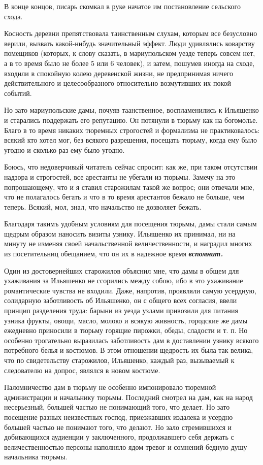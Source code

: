 \documentclass[a4paper,20pt]{article}
\begin{document}
В конце концов, писарь скомкал в руке начатое им постановление сельского схода.

Косность деревни препятствовала таинственным слухам, которым все безусловно
верили, вызвать какой-нибудь значительный эффект. Люди удивлялись коварству
помещиков (которых, к слову сказать, в мариупольском уезде теперь совсем нет, а
в то время было не более 5 или 6 человек), и затем, пошумев иногда на сходе,
входили в спокойную колею деревенской жизни, не предпринимая ничего
действительного и целесообразного относительно возмутивших их покой событий.

Но зато мариупольские дамы, почуяв таанственное, воспламенились к Ильяшенко и
старались поддержать его репутацию. Он потянули в тюрьму как на богомолье.
Благо в то время никаких тюремных строгостей и формализма не практиковалось:
всякий кто хотел мог, без всякого разрешения, посещать тюрьму, когда ему было
угодно и сколько раз ему было угодно.

Боюсь, что недоверчивый читатель сейчас спросит: как же, при таком отсутствии
надзора и строгостей, все арестанты не убегали из тюрьмы. Замечу на это
попрошающему, что и я ставил старожилам такой же вопрос; они отвечали мне, что
не полагалось бегать и что в то время арестантов бежало не больше, чем теперь.
Всякий, мол, знал, что начальство не дозволяет бежать.

Благодаря такимъ удобным условиям для посещения тюрьмы, дамы стали самым
щедрым образом наносить визиты узнику. Ильяшенко их принимал, ни на минуту не
изменяя своей начальственной величественности, и наградил многих из
посетительниц обещанием, что он их в надежное время \textbf{\em вспомнит.}

Один из достовернейших старожилов объяснил мне, что дамы в общем для ухаживания
за Ильяшенко не ссорились между собою, ибо в это ухаживание романтические
чувства не входили.  Даже, напротив, проявляли самую усердную, солидарную
заботливость об Ильяшенко, он с общего всех согласия, ввели принцип разделения
труда: барыни из уезда узлами привозили для питания узника фрукты, овощи,
масло, молоко и всякую живность, городские же дамы ежедневно приносили в тюрьму
горящие пирожки, обеды, сладости и т. п. Но особенно трогательно выразилась
заботливость дам в доставлении узнику всякого потребного белья и костюмов. В
этом отношении щедрость их была так велика, что по свидетельству старожилов,
Ильяшенко, каждый раз, вызываемый к следователю на допрос, являлся в новом
костюме.

Паломничество дам в тюрьму не особенно импонировало тюремной администрации и
начальнику тюрьмы. Последний смотрел на дам, как на народ несерьезный, большей
частью не понимающий того, что делает.  Но зато посещение разных неизвестных
господ, приезжавших издалека и усердно большей частью не понимают того, что
делают. Но зало стремившихся и добивающихся аудиенции у заключенного,
продолжавшего себя держать с величественностью персоны наполняло ядом тревог и
сомнений бедную душу начальника тюрьмы.
\end{document}
